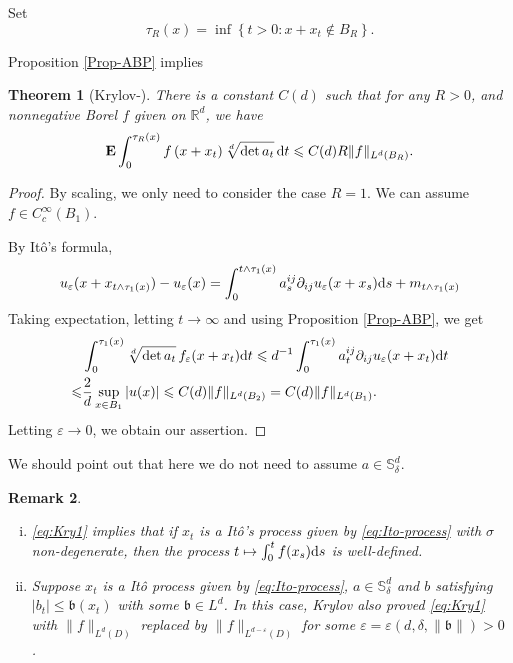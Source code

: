 \documentclass[twoside, 12pt]{book}
\numberwithin{equation}{chapter}
\newtheorem{theorem}{Theorem}[section]
\newtheorem{remark}[theorem]{Remark}
\def\mS{{\mathbb S}}
\def\bE{{\mathbf E}}
\def\l{\left}
\def\r{\right}
\def\leq{\leqslant}
\def\p{\partial}
\def\d{\text{\rm{d}}}
\def\eps{\varepsilon}
\begin{document}
	
	\medspace
	
	Set 
	\[
	\tau_R(x)=\inf\l\{t>0: x+x_t\notin B_R \r\}. 
	\]
	
	Proposition \ref{Prop-ABP} implies 
	\begin{theorem}[Krylov-\cite{krylov1980controlled}]\label{thm:Krylov1}
		There is a constant $C(d)$ such that for any $R>0$, and nonnegative Borel $f$ given on $\mathbb{R}^d$, we have
		\begin{equation}\label{eq:Kry1}
			\bE \int_0^{\tau_{R}(x)} f\left(x+x_t\right) \sqrt[d]{\operatorname{det} a_t} \, \d t \leq C(d)  R\|f\|_{L^d\left(B_R\right)}. 
		\end{equation}
	\end{theorem}
    \begin{proof}
      By scaling, we only need to consider the case $R=1$. We can assume $f\in C_c^\infty(B_1)$. 
      
      By It\^o's formula, 
        \begin{equation*}
            u_\eps (x+x_{t\wedge \tau_1(x)})-u_\eps(x) = \int_0^{t\wedge \tau_1(x)} a^{ij}_s \p_{ij} u_\eps(x+x_s) \d s + m_{t\wedge \tau_1(x)}
        \end{equation*}
      Taking expectation, letting $t\to\infty$ and using Proposition \ref{Prop-ABP}, we get 
      \begin{align*}
          &\int_0^{\tau_1(x)}\sqrt[d]{\det a_t} \, f_{\eps}(x+x_t) \d t  \leq d^{-1}\int_0^{\tau_1(x)} a^{ij}_t \p_{ij}u_\eps(x+x_t) \d t \\
          \leq& \frac{2}{d}\sup_{x\in B_{1}}|u(x)|\leq C(d) \|f\|_{L^d(B_2)}=C(d) \|f\|_{L^d(B_1)}.
      \end{align*}
      Letting $\eps\to0$, we obtain our assertion. 
    \end{proof}
	We should point out that here we do not need to assume $a\in \mS_\delta^d$.  
	\begin{remark}
        \begin{enumerate}[(i)]
         \item \eqref{eq:Kry1} implies that if $x_t$ is a It\^o's process given by \eqref{eq:Ito-process} with $\sigma$ non-degenerate, then the process $t\mapsto \int_0^t f(x_s) \d s$ is well-defined. 
         \item Suppose $x_t$ is a It\^o process given by \eqref{eq:Ito-process}, $a\in \mS^d_\delta$ and $b$ satisfying $|b_t|\leq \mathfrak{b}(x_t)$  with some $\mathfrak{b}\in L^d$.  In this case, Krylov \cite{krylov2021diffusion}  also proved \eqref{eq:Kry1}  with $\|f\|_{L^d(D)}$ replaced by $\|f\|_{L^{d-\eps}(D)}$ for some $\eps=\eps(d, \delta, \|\mathfrak{b}\|)>0$ . 
       \end{enumerate}
	\end{remark}
	
\end{document}
